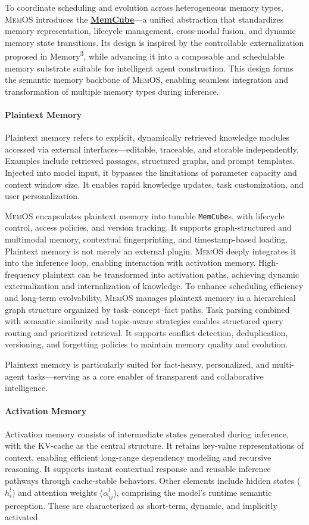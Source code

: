 \documentclass[]{memtensor}
\begin{document}
To coordinate scheduling and evolution across heterogeneous memory types, \textsc{MemOS} introduces the \hyperlink{memcube}{\textbf{MemCube}}—a unified abstraction that standardizes memory representation, lifecycle management, cross-modal fusion, and dynamic memory state transitions.
Its design is inspired by the controllable externalization proposed in Memory\textsuperscript{3}, while advancing it into a composable and schedulable memory substrate suitable for intelligent agent construction.
This design forms the semantic memory backbone of \textsc{MemOS}, enabling seamless integration and transformation of multiple memory types during inference.

\paragraph{\textbf{Plaintext Memory}} 
Plaintext memory refers to explicit, dynamically retrieved knowledge modules accessed via external interfaces—editable, traceable, and storable independently.
Examples include retrieved passages, structured graphs, and prompt templates.
Injected into model input, it bypasses the limitations of parameter capacity and context window size.
It enables rapid knowledge updates, task customization, and user personalization.

\textsc{MemOS} encapsulates plaintext memory into tunable \texttt{MemCube}s, with lifecycle control, access policies, and version tracking.
It supports graph-structured and multimodal memory, contextual fingerprinting, and timestamp-based loading.
Plaintext memory is not merely an external plugin. \textsc{MemOS} deeply integrates it into the inference loop, enabling interaction with activation memory.
High-frequency plaintext can be transformed into activation paths, achieving dynamic externalization and internalization of knowledge.
To enhance scheduling efficiency and long-term evolvability, \textsc{MemOS} manages plaintext memory in a hierarchical graph structure organized by task–concept–fact paths.
Task parsing combined with semantic similarity and topic-aware strategies enables structured query routing and prioritized retrieval.
It supports conflict detection, deduplication, versioning, and forgetting policies to maintain memory quality and evolution.

Plaintext memory is particularly suited for fact-heavy, personalized, and multi-agent tasks—serving as a core enabler of transparent and collaborative intelligence.

\paragraph{\textbf{Activation Memory}}
Activation memory consists of intermediate states generated during inference, with the KV-cache as the central structure.
It retains key-value representations of context, enabling efficient long-range dependency modeling and recursive reasoning.
It supports instant contextual response and reusable inference pathways through cache-stable behaviors.
Other elements include hidden states ($h^l_i$) and attention weights ($\alpha^l_{ij}$), comprising the model’s runtime semantic perception.
These are characterized as short-term, dynamic, and implicitly activated.
\end{document}
